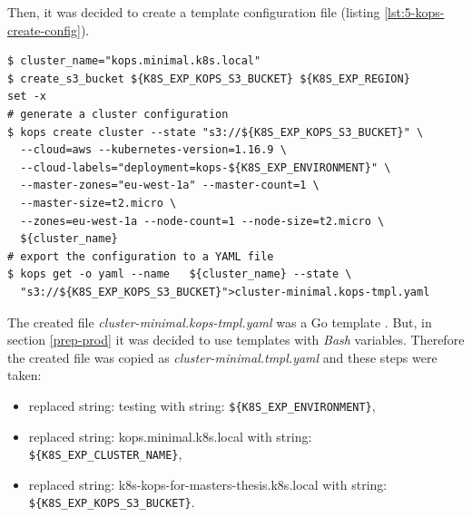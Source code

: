 Then, it was decided to create a template configuration file (listing \ref{lst:5-kops-create-config}).
\begin{lstlisting}[basicstyle=\scriptsize,xleftmargin=0cm,caption={Commands used to generate \textit{kops} configuration}, label=lst:5-kops-create-config]
$ cluster_name="kops.minimal.k8s.local"
$ create_s3_bucket ${K8S_EXP_KOPS_S3_BUCKET} ${K8S_EXP_REGION}
set -x
# generate a cluster configuration
$ kops create cluster --state "s3://${K8S_EXP_KOPS_S3_BUCKET}" \
  --cloud=aws --kubernetes-version=1.16.9 \
  --cloud-labels="deployment=kops-${K8S_EXP_ENVIRONMENT}" \
  --master-zones="eu-west-1a" --master-count=1 \
  --master-size=t2.micro \
  --zones=eu-west-1a --node-count=1 --node-size=t2.micro \
  ${cluster_name}
# export the configuration to a YAML file
$ kops get -o yaml --name   ${cluster_name} --state \
  "s3://${K8S_EXP_KOPS_S3_BUCKET}">cluster-minimal.kops-tmpl.yaml
\end{lstlisting}

The created file \textit{cluster-minimal.kops-tmpl.yaml} was a Go template \cite{online-kops-ct}. But, in section \ref{prep-prod} it was decided to use templates with \textit{Bash} variables. Therefore the created file was copied as \textit{cluster-minimal.tmpl.yaml} and these steps were taken:
\begin{itemize}
\item replaced string: testing with string: \verb|${K8S_EXP_ENVIRONMENT}|,
\item replaced string: kops.minimal.k8s.local with string: \verb|${K8S_EXP_CLUSTER_NAME}|,
\item replaced string: k8s-kops-for-masters-thesis.k8s.local with string: \\
  \verb|${K8S_EXP_KOPS_S3_BUCKET}|.
\end{itemize}


